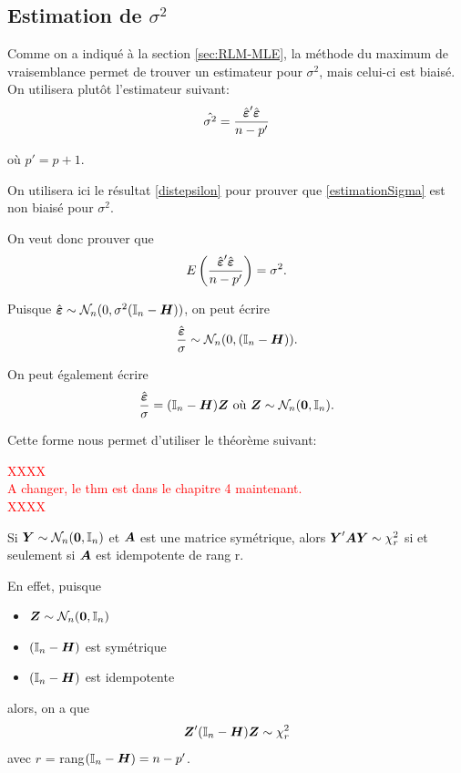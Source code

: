\subsection{Estimation de $\sigma^2$}
\label{sec:RLM-sigma}

Comme on a indiqué à la section \ref{sec:RLM-MLE}, la méthode du maximum de vraisemblance permet de trouver un estimateur pour $\sigma^2$, mais celui-ci est biaisé. On utilisera plutôt l'estimateur suivant:
\begin{eqnarray}
	\hat{\sigma^2}=\frac{\hboeps'\hboeps}{n-p'}
	\label{estimationSigma}
\end{eqnarray}

où $p'=p+1$.

On utilisera ici le résultat \ref{distepsilon} pour prouver que \ref{estimationSigma} est non biaisé pour $\sigma^2$.


On veut donc prouver que
$$ E \left( \frac{\hboeps'\hboeps}{n-p'} \right) = \sigma^2. $$

Puisque $\hboeps \sim \N_n(0, \sigma^2(\boI_n-\boH))$, on peut écrire
$$ \frac{\hboeps}{\sigma} \sim \N_n(0, (\boI_n-\boH)).$$

On peut également écrire
$$ \frac{\hboeps}{\sigma} = (\boI_n - \boH)\bo Z \mbox{    o\`u  } \bo Z \sim \N_n(\bo 0, \boI_n).$$

\newpage
Cette forme nous permet d'utiliser le théorème suivant:

\textcolor{red}{ XXXX \\ A changer, le thm est dans le chapitre 4  maintenant. \\ XXXX}

\begin{theorem}
Si $\boY \sim \N_n(\bo 0,\boI_n)$ et $\bo A$ est une matrice symétrique, alors $\boY'\bo A\boY \sim \chi^2_r$ si et seulement si $\bo A$ est idempotente de rang r.
\end{theorem}

En effet, puisque
\begin{itemize}
\item[$\bullet$] $\bo Z \sim \N_n(\bo 0,\boI_n)$
\item[$\bullet$] $(\boI_n-\boH)$ est symétrique
\item[$\bullet$] $(\boI_n-\boH)$ est idempotente
\end{itemize}
alors, on a que
$$ \bo Z'(\boI_n-\boH) \bo Z \sim \chi^2_r$$
avec $r$ = rang$(\boI_n-\boH) = n-p'$. \\


